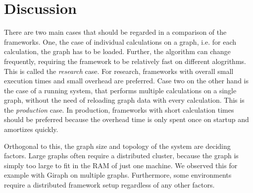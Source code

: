 
\section{Discussion}
There are two main cases that should be regarded in a comparison of the frameworks. One, the case of individual calculations on a graph, i.e. for each calculation, the graph has to be loaded. Further, the algorithm can change frequently, requiring the framework to be relatively fast on different alogrithms. This is called the \emph{research} case. For research, frameworks with overall small execution times and small overhead are preferred. Case two on the other hand is the case of a running system, that performs multiple calculations on a single graph, without the need of reloading graph data with every calculation. This is the \emph{production} case.
In production, frameworks with short calculation times should be preferred because the overhead time is only spent once on startup and amortizes quickly.

Orthogonal to this, the graph size and topology of the system are deciding factors. Large graphs often require a distributed cluster, because the graph is simply too large to fit in the RAM of just one machine. We observed this for example with Giraph on multiple graphs.
Furthermore, some environments require a distributed framework setup regardless of any other factors.

